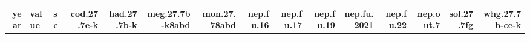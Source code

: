 \documentclass[
]{article}
\begin{document}
\begin{longtable}[]{@{}rllrrrrrrrrrrrr@{}}
\toprule
\begin{minipage}[b]{0.01\columnwidth}\raggedleft
year\strut
\end{minipage} & \begin{minipage}[b]{0.05\columnwidth}\raggedright
value\strut
\end{minipage} & \begin{minipage}[b]{0.11\columnwidth}\raggedright
sc\strut
\end{minipage} & \begin{minipage}[b]{0.04\columnwidth}\raggedleft
cod.27.7e-k\strut
\end{minipage} & \begin{minipage}[b]{0.04\columnwidth}\raggedleft
had.27.7b-k\strut
\end{minipage} & \begin{minipage}[b]{0.05\columnwidth}\raggedleft
meg.27.7b-k8abd\strut
\end{minipage} & \begin{minipage}[b]{0.04\columnwidth}\raggedleft
mon.27.78abd\strut
\end{minipage} & \begin{minipage}[b]{0.04\columnwidth}\raggedleft
nep.fu.16\strut
\end{minipage} & \begin{minipage}[b]{0.03\columnwidth}\raggedleft
nep.fu.17\strut
\end{minipage} & \begin{minipage}[b]{0.03\columnwidth}\raggedleft
nep.fu.19\strut
\end{minipage} & \begin{minipage}[b]{0.04\columnwidth}\raggedleft
nep.fu.2021\strut
\end{minipage} & \begin{minipage}[b]{0.04\columnwidth}\raggedleft
nep.fu.22\strut
\end{minipage} & \begin{minipage}[b]{0.03\columnwidth}\raggedleft
nep.out.7\strut
\end{minipage} & \begin{minipage}[b]{0.04\columnwidth}\raggedleft
sol.27.7fg\strut
\end{minipage} & \begin{minipage}[b]{0.04\columnwidth}\raggedleft
whg.27.7b-ce-k\strut
\end{minipage}\tabularnewline
\midrule
\endhead
\begin{minipage}[t]{0.01\columnwidth}\raggedleft
2020\strut
\end{minipage} & \begin{minipage}[t]{0.05\columnwidth}\raggedright

\end{minipage}
\end{longtable}
\end{document}
